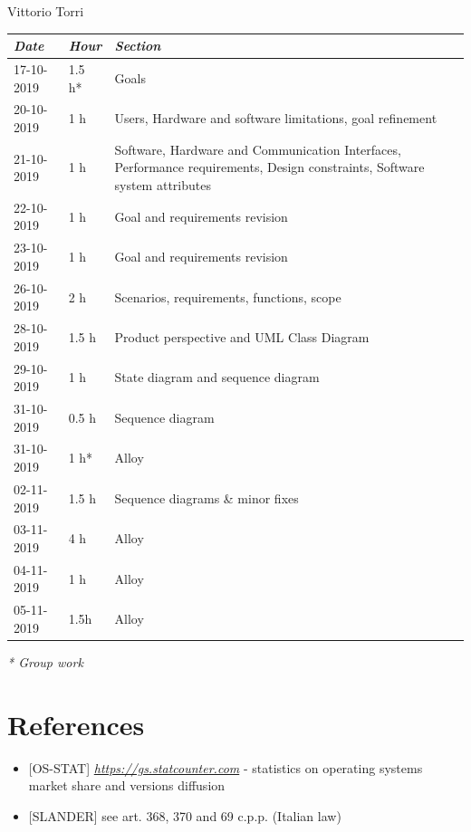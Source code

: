 \documentclass[a4paper]{report}
\begin{document}
\begin{center}
Vittorio Torri \\
\begin{tabular}{p{2cm}p{1.5cm}p{7cm}}
\toprule
\textit{Date} & \textit{Hour} & \textit{Section} \\ \midrule
17-10-2019 & 1.5 h* & Goals \\ \midrule
20-10-2019 & 1 h & Users, Hardware and software limitations, goal refinement \\ \midrule
21-10-2019 & 1 h & Software, Hardware and Communication Interfaces, Performance requirements, Design constraints, Software system attributes \\ \midrule
22-10-2019 & 1 h & Goal and requirements revision \\ \midrule
23-10-2019 & 1 h & Goal and requirements revision \\ \midrule
26-10-2019 & 2 h & Scenarios, requirements, functions, scope \\  \midrule
28-10-2019 & 1.5 h & Product perspective and UML Class Diagram \\ \midrule
29-10-2019 & 1 h & State diagram and sequence diagram \\ \midrule
31-10-2019 & 0.5 h & Sequence diagram \\ \midrule
31-10-2019 & 1 h* & Alloy \\ \midrule
02-11-2019 & 1.5 h & Sequence diagrams \& minor fixes \\ \midrule
03-11-2019 & 4 h & Alloy \\ \midrule
04-11-2019 & 1 h & Alloy \\ \midrule 
05-11-2019 & 1.5h & Alloy \\
\bottomrule
\end{tabular}
\end{center}
\textit{* Group work}

\chapter{References}
\begin{itemize}

\item \label{ref:os-stats} [OS-STAT] \href{https://gs.statcounter.com}{\textit{https://gs.statcounter.com}} - statistics on operating systems market share and versions diffusion

\item \label{ref:slander} [SLANDER] see art. 368, 370 and 69 c.p.p. (Italian law)

\end{itemize}
\end{document}
